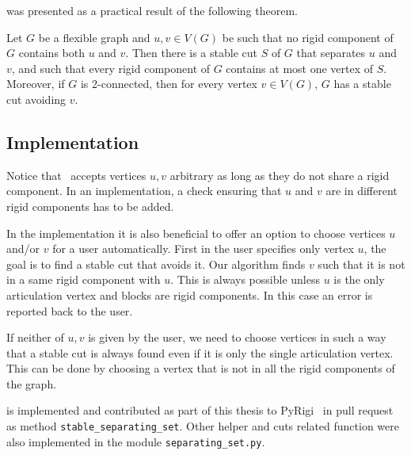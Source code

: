was presented as a practical result of the following theorem.
%
\begin{theorem}
	Let \( G \) be a flexible graph and \( u, v \in V (G) \) be such that no rigid component of \( G \)
	contains both \( u \) and \( v \). Then there is a stable cut \( S \) of \( G \) that separates \( u \) and \( v \), and such that
	every rigid component of \( G \) contains at most one vertex of \( S \). Moreover, if \( G \) is 2-connected,
	then for every vertex \( v \in V(G) \), \( G \) has a stable cut avoiding \( v \).
\end{theorem}
%

\subsection{Implementation}

Notice that~
accepts vertices \( u, v \) arbitrary as long as they do not share a rigid component.
In an implementation, a check ensuring that \( u \) and \( v \)
are in different rigid components has to be added.

In the implementation it is also beneficial to offer an option to choose
vertices \( u \) and/or \(  v \) for a user automatically.
First in the user specifies only vertex \( u \), the goal is to find a stable cut
that avoids it. Our algorithm finds \( v \)
such that it is not in a same rigid component with \( u \).
This is always possible unless \( u \) is the only articulation vertex
and blocks are rigid components. In this case an error is reported back to the user.

If neither of \( u, v \) is given by the user,
we need to choose vertices in such a way
that a stable cut is always found even if it is only the single articulation vertex.
This can be done by choosing a vertex that is not in all the rigid components of the graph.

%
is implemented and contributed as part of this thesis
to PyRigi~\cite{pyrigi} in pull request~\cite{pyrigi_pr_stable_cuts}
as method \texttt{stable\_separating\_set}.
Other helper and cuts related function
were also implemented in the module \texttt{separating\_set.py}.

